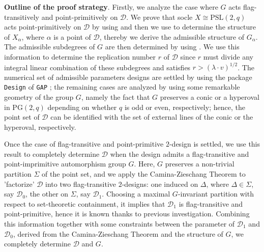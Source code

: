 \documentclass[a4paper,twopage,reqno,12pt]{amsart}
\theoremstyle{definition}
\numberwithin{equation}{section}
\newcommand{\PSL}{\mathrm{PSL}}
\newcommand{\PG}{\mathrm{PG}}
\begin{document}
\noindent \textbf{Outline of the proof strategy}. Firstly, we analyze the case where $G$ acts flag-transitively and point-primitively on $\mathcal{D}$. We prove that socle $X\cong \PSL(2,q)$ acts point-primitively on $\mathcal{D}$ by using \cite{gmaxi} and then we use \cite{Di, COT} to determine the structure of $X_{\alpha}$, where $\alpha$ is a point of $\mathcal{D}$, thereby we derive the admissible structure of $G_{\alpha}$. The admissible subdegrees of $G$ are then determined by using \cite{Ka,FI}. We use this information to determine the replication number $r$ of $\mathcal{D}$ since $r$ must divide any integral linear combination of these subdegrees and satisfies $r>(\lambda \cdot v)^{1/2}$. The numerical set of admissible parameters designs are settled by using the package \texttt{Design} \cite{Design} of \texttt{GAP} \cite{GAP}; the remaining cases are analyzed by using some remarkable geometry of the group $G$, namely the fact that $G$ preserves a conic or a hyperoval in $\PG(2,q)$ depending on whether $q$ is odd or even, respectively; hence, the point set of $\mathcal{D}$ can be identified with the set of external lines of the conic or the hyperoval, respectively.

Once the case of flag-transitive and point-primitive $2$-design is settled, we use this result to completely determine $\mathcal{D}$ when the design admits a flag-transitive and point-imprimitive automorphism group $G$. Here, $G$ preserves a non-trivial partition $\Sigma$ of the point set, and we apply the Camina-Zieschang Theorem \cite{CZ} to 'factorize' $\mathcal{D}$ into two flag-transitive $2$-designs: one induced on $\Delta$, where $\Delta \in \Sigma$, say $\mathcal{D}_{0}$, the other on $\Sigma$, say $\mathcal{D}_{1}$. Choosing a maximal $G$-invariant partition with respect to set-theoretic containment, it implies that $\mathcal{D}_{1}$ is flag-transitive and point-primitive, hence it is known thanks to previous investigation. 
Combining this information together with some  constraints between the parameter of $\mathcal{D}_{1}$ and $\mathcal{D}_{0}$, derived from the Camina-Zieschang Theorem and the structure of $G$, we completely determine $\mathcal{D}$ and $G$. 
\end{document}

